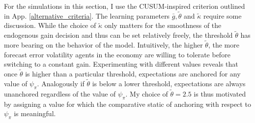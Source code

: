 \documentclass[11pt]{article}
\renewcommand{\[}{\begin{equation}}
\renewcommand{\]}{\end{equation}}
\begin{document}
For the simulations in this section, I use the CUSUM-inspired criterion outlined in App. \ref{alternative_criteria}. The learning parameters $\bar{g}, \tilde{\theta}$ and $\tilde{\kappa}$ require some discussion. While the choice of $\tilde{\kappa}$ only matters for the smoothness of the endogenous gain decision and thus can be set relatively freely, the threshold $\tilde{\theta}$ has more bearing on the behavior of the model. Intuitively, the higher $\tilde{\theta}$, the more forecast error volatility agents in the economy are willing to tolerate before switching to a constant gain. Experimenting with different values reveals that once $\tilde{\theta}$ is higher than a particular threshold, expectations are anchored for any value of $\psi_{\pi}$. Analogously if $\tilde{\theta}$ is below a lower threshold, expectations are always unanchored regardless of the value of $\psi_{\pi}$. My choice of $\tilde{\theta}=2.5$ is thus motivated by assigning a value for which the comparative static of anchoring with respect to $\psi_{\pi}$ is meaningful. 
\end{document}
